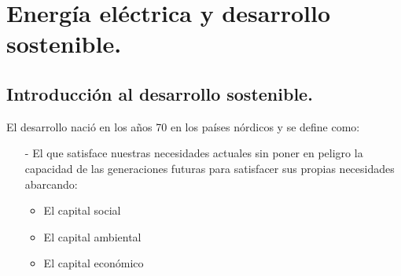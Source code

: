 \chapter{Energía eléctrica y desarrollo sostenible.}

\section{Introducción al desarrollo sostenible.}
El desarrollo nació en los años 70 en los países nórdicos y se define como:
\begin{itemize}
	\item [-] El que satisface
	nuestras necesidades actuales sin poner en peligro la
	capacidad de las generaciones futuras para satisfacer sus
	propias necesidades abarcando:
	\begin{itemize}
		\item El capital social
		\item El capital ambiental
		\item El capital económico
	\end{itemize}
\end{itemize}
